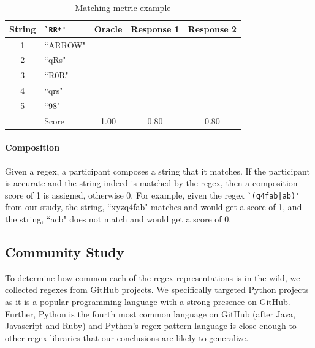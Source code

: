 \begin{table}
\caption{Matching metric example \label{matchingmetric}}
\begin{center}
\begin{small}
\begin{tabular} {cl | c c c}
\textbf{String} & \verb!`RR*'! & \textbf{Oracle} & \textbf{Response 1} & \textbf{Response 2} \\ \hline
1 & ``ARROW" 	& \checkmark	& \checkmark	& \checkmark\\
2 & ``qRs" 		& \checkmark	& \checkmark	&\\
3 & ``R0R" 		& \checkmark 	& \checkmark 	& \checkmark\\
4 & ``qrs"		& 			& \checkmark 	&\\
5 & ``98"  		& 			&			&\\ \hline
& Score 		& 1.00		& 0.80		& 0.80 \\
\end{tabular}
\end{small}
\end{center}
\end{table}

\paragraph{Composition}
Given a regex, a participant composes a string that it matches. If the participant is accurate and the string indeed is matched by the regex, then a composition score of 1 is assigned, otherwise 0.  For example, given the regex \verb!`(q4fab|ab)'! from our study, the string, ``xyzq4fab" matches  and would get a score of 1, and the string, ``acb" does not match and would get a score of 0. 


\subsection{Community Study}
\label{communitystudy}
To determine how common each of the regex representations is in the wild, we collected
regexes from GitHub projects. We specifically targeted Python projects as it is a popular programming language with a strong presence on GitHub. Further, Python is the fourth most common language on GitHub (after Java, Javascript and Ruby) and Python's regex pattern
language is close enough to other regex libraries that our conclusions are likely to generalize.




